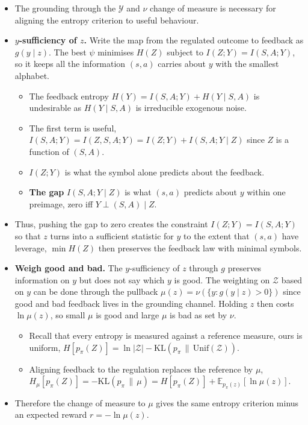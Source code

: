 \documentclass[10pt]{article}
\begin{document}
\begin{itemize}
  \item The grounding through the $\mathcal Y$ and $\nu$ change of measure is necessary for aligning the entropy criterion to useful behaviour.
  \item \textbf{$y$-sufficiency of $z$.}
  Write the map from the regulated outcome to feedback as $g(y \mid z)$.
  The best $\psi$ minimises $H(Z)$ subject to $I(Z;Y) = I(S,A;Y)$, so it keeps all the information $(s,a)$ carries about $y$ with the smallest alphabet.
  \begin{itemize}
    \item The feedback entropy $H(Y) = I(S,A;Y) + H(Y \mid S,A)$ is undesirable as $H(Y \mid S,A)$ is irreducible exogenous noise.
    \item The first term is useful, $I(S,A;Y) = I(Z,S,A;Y) = I(Z;Y) + I(S,A;Y \mid Z)$ since $Z$ is a function of $(S,A)$. 
    \item $I(Z;Y)$ is what the symbol alone predicts about the feedback.
    \item \textbf{The gap} $I(S,A;Y \mid Z)$ is what $(s,a)$ predicts about $y$ within one preimage, zero iff $Y \perp (S,A) \mid Z$.
  \end{itemize}
  \item Thus, pushing the gap to zero creates the constraint $I(Z;Y) = I(S,A;Y)$ so that $z$ turns into a sufficient statistic for $y$ to the extent that $(s,a)$ have leverage, $\min H(Z)$ then preserves the feedback law with minimal symbols.
  \item \textbf{Weigh good and bad.} The $y$-sufficiency of $z$ through $g$ preserves information on $y$ but does not say which $y$ is good. The weighting on $\mathcal Z$ based on $y$ can be done through the pullback $\mu(z) = \nu(\{y : g(y \mid z) > 0\})$ since good and bad feedback lives in the grounding channel. Holding $z$ then costs $\ln \mu(z)$, so small $\mu$ is good and large $\mu$ is bad as set by $\nu$.
  \begin{itemize}
    \item Recall that every entropy is measured against a reference measure, ours is uniform, $H[p_\pi(Z)] = \ln |\mathcal Z| - \mathrm{KL}(p_\pi \,\|\, \mathrm{Unif}(\mathcal Z))$.
    \item Aligning feedback to the regulation replaces the reference by $\mu$, $H_\mu[p_\pi(Z)] = -\mathrm{KL}(p_\pi \,\|\, \mu) = H[p_\pi(Z)] + \mathbb{E}_{p_\pi(z)} [\ln \mu(z)]$.
  \end{itemize}
  \item Therefore the change of measure to $\mu$ gives the same entropy criterion minus an expected reward $r = -\ln \mu(z)$.

\end{itemize}
\end{document}
